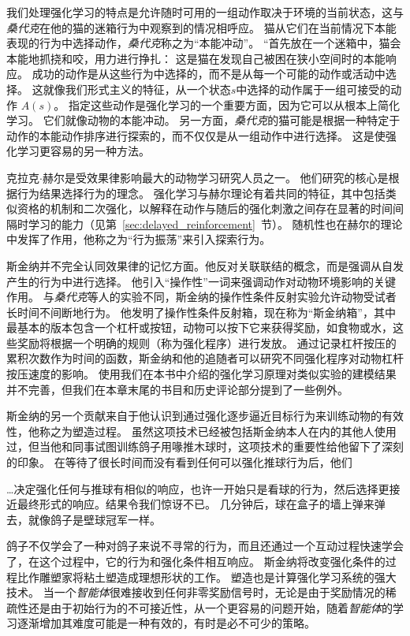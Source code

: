 我们处理强化学习的特点是允许随时可用的一组动作取决于环境的当前状态，这与\textit{桑代克}在他的猫的迷箱行为中观察到的情况相呼应。
猫从它们在当前情况下本能表现的行为中选择动作，\textit{桑代克}称之为“本能冲动”。
“首先放在一个迷箱中，猫会本能地抓挠和咬，用力进行挣扎：
这是猫在发现自己被困在狭小空间时的本能响应。
成功的动作是从这些行为中选择的，而不是从每一个可能的动作或活动中选择。
这就像我们形式主义的特征，从一个状态$ s $中选择的动作属于一组可接受的动作 $ A(s) $。
指定这些动作是强化学习的一个重要方面，因为它可以从根本上简化学习。
它们就像动物的本能冲动。
另一方面，\textit{桑代克}的猫可能是根据一种特定于动作的本能动作排序进行探索的，而不仅仅是从一组动作中进行选择。
这是使强化学习更容易的另一种方法。


克拉克$\cdot$赫尔\cite{skinner2019behavior}是受效果律影响最大的动物学习研究人员之一。
他们研究的核心是根据行为结果选择行为的理念。
强化学习与赫尔理论有着共同的特征，其中包括类似资格的机制和二次强化，以解释在动作与随后的强化刺激之间存在显著的时间间隔时学习的能力（见第~\ref{sec:delayed_reinforcement}~节）。
随机性也在赫尔的理论中发挥了作用，他称之为“行为振荡”来引入探索行为。


斯金纳并不完全认同效果律的记忆方面。他反对关联联结的概念，而是强调从自发产生的行为中进行选择。
他引入“操作性”一词来强调动作对动物环境影响的关键作用。
与\textit{桑代克}等人的实验不同，斯金纳的操作性条件反射实验允许动物受试者长时间不间断地行为。
他发明了操作性条件反射箱，现在称为“斯金纳箱”，其中最基本的版本包含一个杠杆或按钮，动物可以按下它来获得奖励，如食物或水，这些奖励将根据一个明确的规则（称为强化程序）进行发放。
通过记录杠杆按压的累积次数作为时间的函数，斯金纳和他的追随者可以研究不同强化程序对动物杠杆按压速度的影响。
使用我们在本书中介绍的强化学习原理对类似实验的建模结果并不完善，但我们在本章末尾的书目和历史评论部分提到了一些例外。


斯金纳的另一个贡献来自于他认识到通过强化逐步逼近目标行为来训练动物的有效性，他称之为塑造过程。
虽然这项技术已经被包括斯金纳本人在内的其他人使用过，但当他和同事试图训练鸽子用喙推木球时，这项技术的重要性给他留下了深刻的印象。
在等待了很长时间而没有看到任何可以强化推球行为后，他们


…决定强化任何与推球有相似的响应，也许一开始只是看球的行为，然后选择更接近最终形式的响应。结果令我们惊讶不已。
几分钟后，球在盒子的墙上弹来弹去，就像鸽子是壁球冠军一样\cite{skinner1958reinforcement}。


鸽子不仅学会了一种对鸽子来说不寻常的行为，而且还通过一个互动过程快速学会了，在这个过程中，它的行为和强化条件相互响应。
斯金纳将改变强化条件的过程比作雕塑家将粘土塑造成理想形状的工作。
塑造也是计算强化学习系统的强大技术。
当一个\textit{智能体}很难接收到任何非零奖励信号时，无论是由于奖励情况的稀疏性还是由于初始行为的不可接近性，从一个更容易的问题开始，随着\textit{智能体}的学习逐渐增加其难度可能是一种有效的，有时是必不可少的策略。



